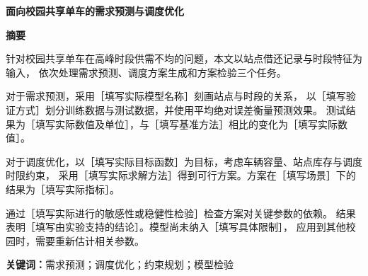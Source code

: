 \documentclass[UTF8,11pt,a4paper,linespread=1]{ctexart}
\begin{document}
\pagestyle{plain}
\begin{center}
  {\bfseries 面向校园共享单车的需求预测与调度优化}\par
  \vspace{.7em}
  {\large\bfseries 摘\quad 要}
\end{center}

针对校园共享单车在高峰时段供需不均的问题，本文以站点借还记录与时段特征为输入，
依次处理需求预测、调度方案生成和方案检验三个任务。

对于需求预测，采用［填写实际模型名称］刻画站点与时段的关系，
以［填写验证方式］划分训练数据与测试数据，并使用平均绝对误差衡量预测效果。
测试结果为［填写实际数值及单位］，与［填写基准方法］相比的变化为［填写实际数值］。

对于调度优化，以［填写实际目标函数］为目标，考虑车辆容量、站点库存与调度时限约束，
采用［填写实际求解方法］得到可行方案。方案在［填写场景］下的结果为［填写实际指标］。

通过［填写实际进行的敏感性或稳健性检验］检查方案对关键参数的依赖。
结果表明［填写由实验支持的结论］。模型尚未纳入［填写具体限制］，
应用到其他校园时，需要重新估计相关参数。

\par\medskip\noindent
\textbf{关键词：}需求预测；调度优化；约束规划；模型检验
\end{document}
